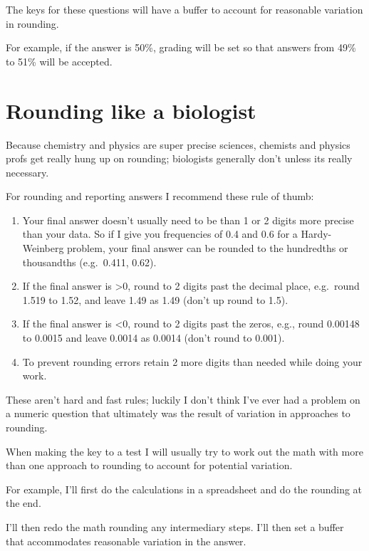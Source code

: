 \documentclass[
]{book}
\providecommand{\tightlist}{%
  \setlength{\itemsep}{0pt}\setlength{\parskip}{0pt}}
\begin{document}
The keys for these questions will have a buffer to account for reasonable variation in rounding.

For example, if the answer is 50\%, grading will be set so that answers from 49\% to 51\% will be accepted.

\hypertarget{rounding-like-a-biologist}{%
\section{Rounding like a biologist}\label{rounding-like-a-biologist}}

Because chemistry and physics are super precise sciences, chemists and physics profs get really hung up on rounding; biologists generally don't unless its really necessary.

For rounding and reporting answers I recommend these rule of thumb:

\begin{enumerate}
\def\labelenumi{\arabic{enumi}.}
\tightlist
\item
  Your final answer doesn't usually need to be than 1 or 2 digits more precise than your data. So if I give you frequencies of 0.4 and 0.6 for a Hardy-Weinberg problem, your final answer can be rounded to the hundredths or thousandths (e.g.~0.411, 0.62).
\item
  If the final answer is \textgreater0, round to 2 digits past the decimal place, e.g.~round 1.519 to 1.52, and leave 1.49 as 1.49 (don't up round to 1.5).
\item
  If the final answer is \textless0, round to 2 digits past the zeros, e.g., round 0.00148 to 0.0015 and leave 0.0014 as 0.0014 (don't round to 0.001).
\item
  To prevent rounding errors retain 2 more digits than needed while doing your work.
\end{enumerate}

These aren't hard and fast rules; luckily I don't think I've ever had a problem on a numeric question that ultimately was the result of variation in approaches to rounding.

When making the key to a test I will usually try to work out the math with more than one approach to rounding to account for potential variation.

For example, I'll first do the calculations in a spreadsheet and do the rounding at the end.

I'll then redo the math rounding any intermediary steps. I'll then set a buffer that accommodates reasonable variation in the answer.
\end{document}
